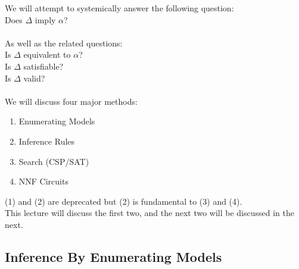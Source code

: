 \documentclass[../../lecture_notes.tex]{subfiles}
\begin{document}
\noindent We will attempt to systemically answer the following question:\\
\indent Does $\Delta$ imply $\alpha$?\\
\\
As well as the related questions:\\
	\indent Is $\Delta$ equivalent to $\alpha$?\\
	\indent Is $\Delta$ satisfiable?\\
	\indent Is $\Delta$ valid?\\
\\
We will discuss four major methods:
\begin{enumerate} [itemsep=0mm]
	\item Enumerating Models
	\item Inference Rules
	\item Search (CSP/SAT)
	\item NNF Circuits
\end{enumerate}
(1) and (2) are deprecated but (2) is fundamental to (3) and (4).\\
This lecture will discuss the first two, and the next two will be discussed in the next.

\subsection*{Inference By Enumerating Models}
\end{document}
